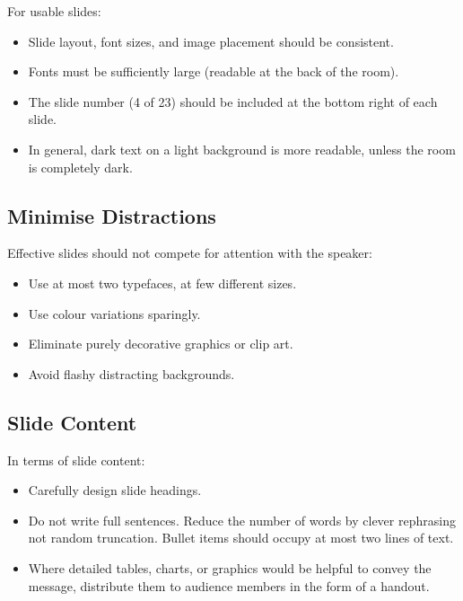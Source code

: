 For usable slides:
\begin{itemize}
\item Slide layout, font sizes, and image placement should be
  consistent.

\item Fonts must be sufficiently large (readable at the back of the
  room).

\item The slide number (4 of 23) should be included at the bottom
  right of each slide.

\item In general, dark text on a light background is more readable,
  unless the room is completely dark.\\
\end{itemize}



\subsection{Minimise Distractions}

Effective slides should not compete for attention with the speaker:
\begin{itemize}
\item Use at most two typefaces, at few different sizes.

\item Use colour variations sparingly.

\item Eliminate purely decorative graphics or clip art.

\item Avoid flashy distracting backgrounds.
\end{itemize}



\subsection{Slide Content}

In terms of slide content:
\begin{itemize}
\item Carefully design slide headings.

\item Do not write full sentences. Reduce the number of words by
  clever rephrasing not random truncation. Bullet items should occupy
  at most two lines of text.

\item Where detailed tables, charts, or graphics would be helpful to
  convey the message, distribute them to audience members in
  the form of a handout.
\end{itemize}





